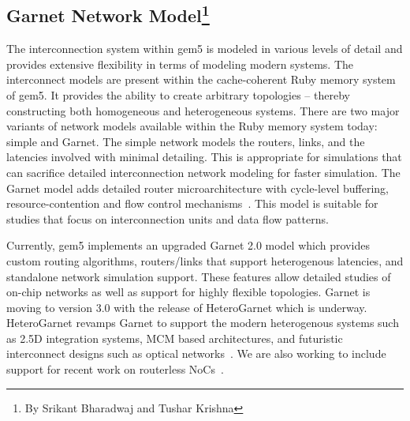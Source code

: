 \subsection[Garnet Network Model]{Garnet Network Model\footnote{By Srikant Bharadwaj and Tushar Krishna}}
\label{sec:garnet}

The interconnection system within gem5 is modeled in various levels of detail and provides extensive
flexibility in terms of modeling modern systems.
The interconnect models are present within the cache-coherent Ruby memory system of gem5.
It provides the ability to create arbitrary topologies – thereby constructing both homogeneous and heterogeneous systems.
There are two major variants of network models available within the Ruby memory system today: simple and Garnet.
The simple network models the routers, links, and the latencies involved with minimal detailing.
This is appropriate for simulations that can sacrifice detailed interconnection network modeling for faster simulation.
The Garnet model adds detailed router microarchitecture with cycle-level buffering, resource-contention and flow control mechanisms~\cite{garnet-2}.
This model is suitable for studies that focus on interconnection units and data flow patterns.

Currently, gem5 implements an upgraded Garnet 2.0 model which provides custom routing algorithms, routers/links that support heterogenous latencies, and standalone network simulation support.
These features allow detailed studies of on-chip networks as well as support for highly flexible topologies.
Garnet is moving to version 3.0 with the release of HeteroGarnet which is underway.
HeteroGarnet revamps Garnet to support the modern heterogenous systems such as 2.5D integration systems, MCM based architectures, and futuristic interconnect designs such as optical networks~\cite{kite}.
We are also working to include support for recent work on routerless NoCs~\cite{AlazemiABC18, LinPPC20}.

